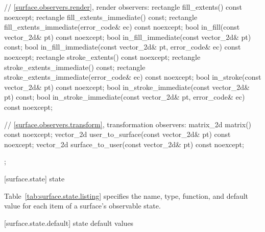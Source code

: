 \begin{codeblock}
{{{{{    // \ref{surface.observers.render}, render observers:
    rectangle fill_extents() const noexcept;
    rectangle fill_extents_immediate() const;
    rectangle fill_extents_immediate(error_code& ec) const noexcept;
    bool in_fill(const vector_2d& pt) const noexcept;
    bool in_fill_immediate(const vector_2d& pt) const;
    bool in_fill_immediate(const vector_2d& pt, error_code& ec) const noexcept;
    rectangle stroke_extents() const noexcept;
    rectangle stroke_extents_immediate() const;
    rectangle stroke_extents_immediate(error_code& ec) const noexcept;
    bool in_stroke(const vector_2d& pt) const noexcept;
    bool in_stroke_immediate(const vector_2d& pt) const;
    bool in_stroke_immediate(const vector_2d& pt, error_code& ec) const 
      noexcept;
    
    // \ref{surface.observers.transform}, transformation observers:
    matrix_2d matrix() const noexcept;
    vector_2d user_to_surface(const vector_2d& pt) const noexcept;
    vector_2d surface_to_user(const vector_2d& pt) const noexcept;
  };
} } } }
\end{codeblock}

 [surface.state] { state}

\pnum
Table~\ref{tab:surface.state.listing} specifies the name, type, function, and default value for each item of a surface's observable state.

 [surface.state.default] { state default values}

